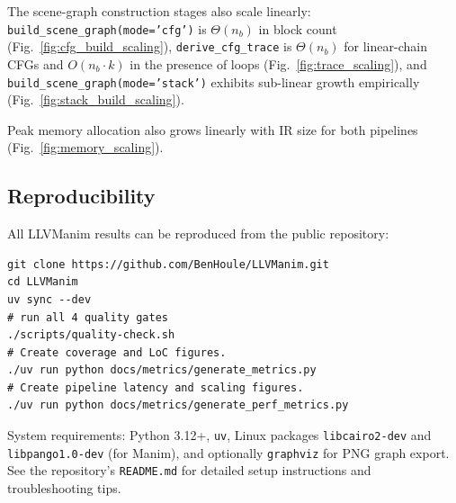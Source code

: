 The scene-graph construction stages also scale linearly: \texttt{build\_scene\_graph(mode='cfg')} is $\Theta(n_b)$ in block count (Fig.~\ref{fig:cfg_build_scaling}), \texttt{derive\_cfg\_trace} is $\Theta(n_b)$ for linear-chain CFGs and $O(n_b \cdot k)$ in the presence of loops (Fig.~\ref{fig:trace_scaling}), and \texttt{build\_scene\_graph(mode='stack')} exhibits sub-linear growth empirically (Fig.~\ref{fig:stack_build_scaling}).









Peak memory allocation also grows linearly with IR size for both pipelines (Fig.~\ref{fig:memory_scaling}).

\subsection{Reproducibility}
All LLVManim results can be reproduced from the public repository\cite{llvmanim-repo}:

\begin{verbatim}
git clone https://github.com/BenHoule/LLVManim.git
cd LLVManim
uv sync --dev
# run all 4 quality gates
./scripts/quality-check.sh
# Create coverage and LoC figures.
./uv run python docs/metrics/generate_metrics.py
# Create pipeline latency and scaling figures.
./uv run python docs/metrics/generate_perf_metrics.py
\end{verbatim}

System requirements: Python 3.12+, \texttt{uv}, Linux packages \texttt{libcairo2-dev} and \texttt{libpango1.0-dev} (for Manim), and optionally \texttt{graphviz} for PNG graph export. See the repository's \texttt{README.md} for detailed setup instructions and troubleshooting tips.
